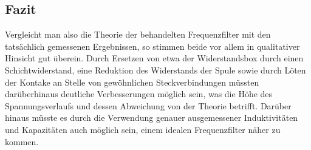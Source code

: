 \subsection{Fazit}
Vergleicht man also die Theorie der behandelten Frequenzfilter mit den tatsächlich gemessenen Ergebnissen, so stimmen beide vor allem in qualitativer Hinsicht gut überein. Durch Ersetzen von etwa der Widerstandsbox durch einen Schichtwiderstand, eine Reduktion des Widerstands der Spule sowie durch Löten der Kontake an Stelle von gewöhnlichen Steckverbindungen müssten darüberhinaus deutliche Verbesserungen möglich sein, was die Höhe des Spannungsverlaufs und dessen Abweichung von der Theorie betrifft. 
Darüber hinaus müsste es durch die Verwendung genauer ausgemessener Induktivitäten und Kapazitäten auch möglich sein, einem idealen Frequenzfilter näher zu kommen. 
